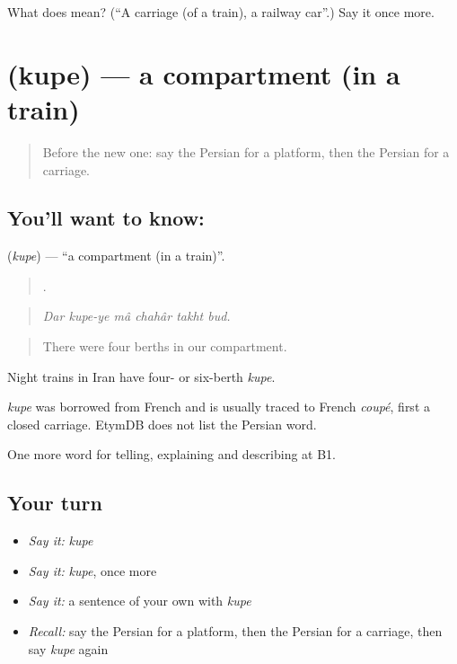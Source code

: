 \begin{tcolorbox}[breakable,colback=teal!4,colframe=teal!35!black,title={Before you move on}]
What does  mean? (\textquotedblleft{}A carriage (of a train), a railway car\textquotedblright{}.) Say it once more.
\end{tcolorbox}
\section[\texorpdfstring{\fa{کوپه} (kupe)}{کوپه (kupe)}]{ (kupe) — a compartment (in a train)}

\label{lesson:FA-C429-kupe}



\begin{quote}
Before the new one: say the Persian for a platform, then the Persian for a carriage.
\end{quote}

\subsection*{You'll want to know: }
\textbf{} (\emph{kupe}) — \textquotedblleft{}a compartment (in a train)\textquotedblright{}.

\begin{quote}
     .
\end{quote}

\begin{quote}
\emph{Dar kupe-ye mâ chahâr takht bud.}
\end{quote}

\begin{quote}
There were four berths in our compartment.
\end{quote}

Night trains in Iran have four- or six-berth \emph{kupe}.

\begin{cousinweb}
\emph{kupe} was borrowed from French and is usually traced to French \emph{coupé}, first a closed carriage. EtymDB does not list the Persian word.
\end{cousinweb}

\begin{grammarlens}[title={What you've built}]
One more word for telling, explaining and describing at B1.
\end{grammarlens}

\subsection*{Your turn}
\begin{itemize}
\raggedright
  \item \emph{Say it:} \emph{kupe}
  \item \emph{Say it:} \emph{kupe}, once more
  \item \emph{Say it:} a sentence of your own with \emph{kupe}
  \item \emph{Recall:} say the Persian for a platform, then the Persian for a carriage, then say \emph{kupe} again
\end{itemize}

